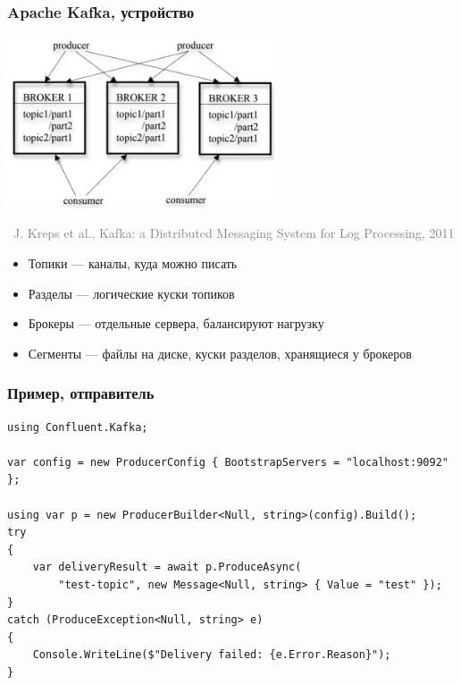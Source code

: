 \documentclass[xetex,mathserif,serif]{beamer}
\newcommand{\attribution}[1] {
    \vspace{-5mm}\begin{flushright}\begin{scriptsize}\textcolor{gray}{\textcopyright\, #1}\end{scriptsize}\end{flushright}
}
\begin{document}
    \begin{frame}
        \frametitle{Apache Kafka, устройство}
        \begin{center}
            \includegraphics[width=0.6\textwidth]{kafkaArchitecture.png}
            \attribution{J. Kreps et al., Kafka: a Distributed Messaging System for Log Processing, 2011}
        \end{center}
        \begin{itemize}
            \item Топики --- каналы, куда можно писать
            \item Разделы --- логические куски топиков
            \item Брокеры --- отдельные сервера, балансируют нагрузку
            \item Сегменты --- файлы на диске, куски разделов, хранящиеся у брокеров
        \end{itemize}
    \end{frame}

    \begin{frame}[fragile]
        \frametitle{Пример, отправитель}
        \begin{small}
            \begin{verbatim}
using Confluent.Kafka;

var config = new ProducerConfig { BootstrapServers = "localhost:9092" };

using var p = new ProducerBuilder<Null, string>(config).Build();
try
{
    var deliveryResult = await p.ProduceAsync(
        "test-topic", new Message<Null, string> { Value = "test" });
}
catch (ProduceException<Null, string> e)
{
    Console.WriteLine($"Delivery failed: {e.Error.Reason}");
}
            \end{verbatim}
        \end{small}
    \end{frame}
\end{document}

